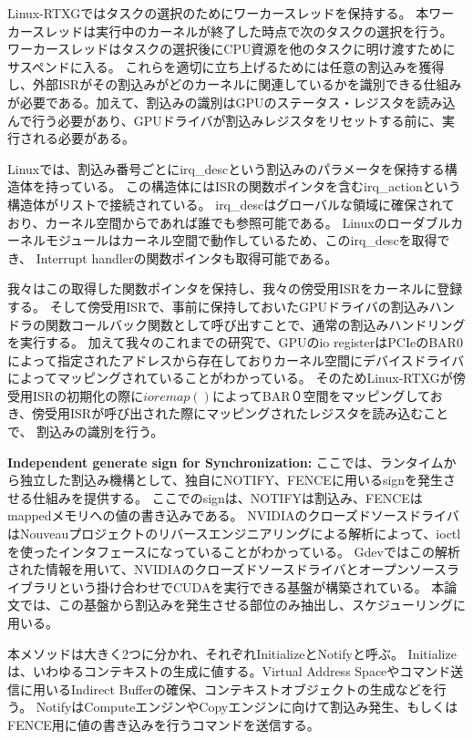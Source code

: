 Linux-RTXGではタスクの選択のためにワーカースレッドを保持する。
本ワーカースレッドは実行中のカーネルが終了した時点で次のタスクの選択を行う。
ワーカースレッドはタスクの選択後にCPU資源を他のタスクに明け渡すためにサスペンドに入る。
これらを適切に立ち上げるためには任意の割込みを獲得し、外部ISRがその割込みがどのカーネルに関連しているかを識別できる仕組みが必要である。加えて、割込みの識別はGPUのステータス・レジスタを読み込んで行う必要があり、GPUドライバが割込みレジスタをリセットする前に、実行される必要がある。

Linuxでは、割込み番号ごとにirq\_descという割込みのパラメータを保持する構造体を持っている。
この構造体にはISRの関数ポインタを含むirq\_actionという構造体がリストで接続されている。
irq\_descはグローバルな領域に確保されており、カーネル空間からであれば誰でも参照可能である。
Linuxのローダブルカーネルモジュールはカーネル空間で動作しているため、このirq\_descを取得でき、
Interrupt handlerの関数ポインタも取得可能である。

我々はこの取得した関数ポインタを保持し、我々の傍受用ISRをカーネルに登録する。
そして傍受用ISRで、事前に保持しておいたGPUドライバの割込みハンドラの関数コールバック関数として呼び出すことで、通常の割込みハンドリングを実行する。
加えて我々のこれまでの研究\cite{fujii:icpads2013,kato2013zero}で、GPUのio registerはPCIeのBAR0によって指定されたアドレスから存在しておりカーネル空間にデバイスドライバによってマッピングされていることがわかっている。
そのためLinux-RTXGが傍受用ISRの初期化の際に$ioremap()$によってBAR０空間をマッピングしておき、傍受用ISRが呼び出された際にマッピングされたレジスタを読み込むことで、
割込みの識別を行う。


\textbf{Independent generate sign for Synchronization:}
ここでは、ランタイムから独立した割込み機構として、独自にNOTIFY、FENCEに用いるsignを発生させる仕組みを提供する。
ここでのsignは、NOTIFYは割込み、FENCEはmappedメモリへの値の書き込みである。
NVIDIAのクローズドソースドライバはNouveauプロジェクトのリバースエンジニアリングによる解析によって、ioctlを使ったインタフェースになっていることがわかっている。
Gdevではこの解析された情報を用いて、NVIDIAのクローズドソースドライバとオープンソースライブラリという掛け合わせでCUDAを実行できる基盤が構築されている。
本論文では、この基盤から割込みを発生させる部位のみ抽出し、スケジューリングに用いる。

本メソッドは大きく2つに分かれ、それぞれInitializeとNotifyと呼ぶ。
Initializeは、いわゆるコンテキストの生成に値する。Virtual Address Spaceやコマンド送信に用いるIndirect Bufferの確保、コンテキストオブジェクトの生成などを行う。
NotifyはComputeエンジンやCopyエンジンに向けて割込み発生、もしくはFENCE用に値の書き込みを行うコマンドを送信する。

